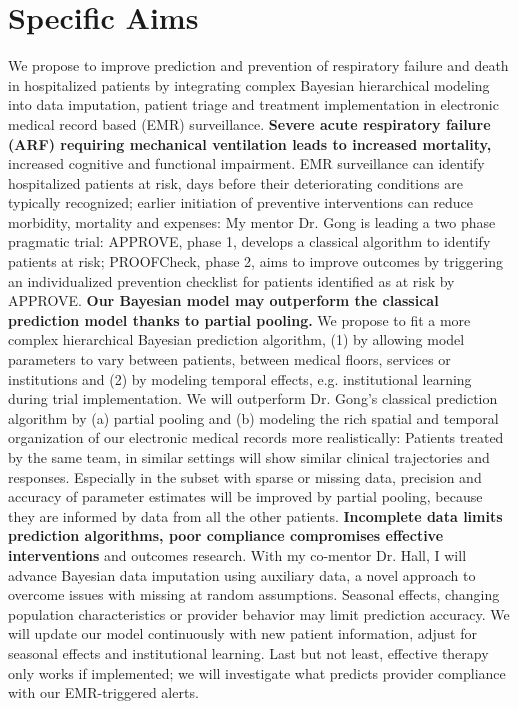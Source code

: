 \documentclass[11pt,notitlepage]{article}
\begin{document}
\part*{Specific Aims}
We propose to improve prediction and prevention of respiratory failure and death in hospitalized patients by integrating complex Bayesian hierarchical modeling into data imputation, patient triage and treatment implementation in electronic medical record based (EMR) surveillance.\newline
\textbf{Severe acute respiratory failure (ARF) requiring mechanical ventilation leads to increased mortality,} increased cognitive and functional impairment. EMR surveillance can identify hospitalized patients at risk, days before their deteriorating conditions are typically recognized; earlier initiation of preventive interventions can reduce morbidity, mortality and expenses: My mentor Dr. Gong is leading a two phase pragmatic trial: APPROVE, phase 1, develops a classical algorithm to identify patients at risk; PROOFCheck, phase 2, aims to improve outcomes by triggering an individualized prevention checklist for patients identified as at risk by APPROVE. \newline
\textbf{Our Bayesian model may outperform the classical prediction model thanks to partial pooling.} 
We propose to fit a more complex hierarchical Bayesian prediction algorithm, (1) by allowing model parameters to vary between patients, between medical floors, services or institutions and (2) by modeling temporal effects, e.g. institutional learning during trial implementation. We will outperform Dr. Gong's classical prediction algorithm by (a) partial pooling and (b) modeling the rich spatial and temporal organization of our electronic medical records more realistically: Patients treated by the same team, in similar settings will show similar clinical trajectories and responses. Especially in the subset with sparse or missing data, precision and accuracy of parameter estimates will be improved by partial pooling, because they are informed by data from all the other patients. 
\newline \textbf{Incomplete data limits prediction algorithms, poor compliance compromises effective interventions} and outcomes research. With my co-mentor Dr. Hall, I will advance Bayesian data imputation using auxiliary data, a novel approach to overcome issues with missing at random assumptions. Seasonal effects, changing population characteristics or provider behavior may limit prediction accuracy. We will update our model continuously with new patient information, adjust for seasonal effects and institutional learning. Last but not least, effective therapy only works if implemented; we will investigate what predicts provider compliance with our EMR-triggered alerts. 
\end{document}
